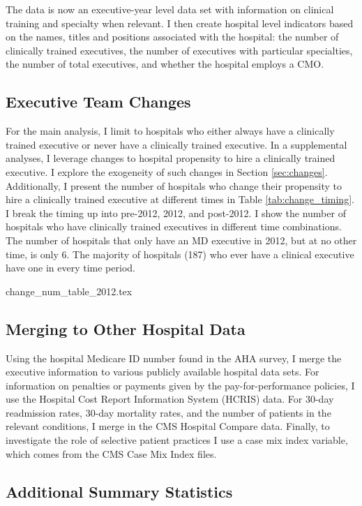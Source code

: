\documentclass[12pt]{article}
\begin{document}
The data is now an executive-year level data set with information on clinical training and specialty when relevant. I then create hospital level indicators based on the names, titles and positions associated with the hospital: the number of clinically trained executives, the number of executives with particular specialties, the number of total executives, and whether the hospital employs a CMO. 

\subsection{Executive Team Changes}\label{app:changes}

For the main analysis, I limit to hospitals who either always have a clinically trained executive or never have a clinically trained executive. In a supplemental analyses, I leverage changes to hospital propensity to hire a clinically trained executive. I explore the exogeneity of such changes in Section \ref{sec:changes}. Additionally, I present the number of hospitals who change their propensity to hire a clinically trained executive at different times in Table \ref{tab:change_timing}. I break the timing up into pre-2012, 2012, and post-2012. I show the number of hospitals who have clinically trained executives in different time combinations. The number of hospitals that only have an MD executive in 2012, but at no other time, is only 6. The majority of hospitals (187) who ever have a clinical executive have one in every time period. 

{change_num_table_2012.tex}


\subsection{Merging to Other Hospital Data}

Using the hospital Medicare ID number found in the AHA survey, I merge the executive information to various publicly available hospital data sets. For information on penalties or payments given by the pay-for-performance policies, I use the Hospital Cost Report Information System (HCRIS) data. For 30-day readmission rates, 30-day mortality rates, and the number of patients in the relevant conditions, I merge in the CMS Hospital Compare data. Finally, to investigate the role of selective patient practices I use a case mix index variable, which comes from the CMS Case Mix Index files. 



\subsection{Additional Summary Statistics}\label{app:sumstats}
\end{document}

